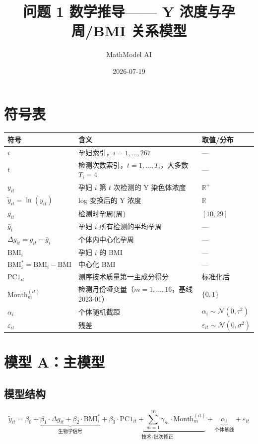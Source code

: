 \documentclass{internal-report}
\title{问题 1 数学推导—— Y 浓度与孕周/BMI 关系模型}
\author{MathModel AI}
\date{2026-07-19}
\begin{document}
\maketitle

\section{符号表}

\begin{tabular}{lll}
\toprule
符号 & 含义 & 取值/分布 \\
\midrule
$i$ & 孕妇索引，$i=1,\dots,267$ & — \\
$t$ & 检测次数索引，$t=1,\dots,T_i$，大多数 $T_i=4$ & — \\
$y_{it}$ & 孕妇 $i$ 第 $t$ 次检测的 Y 染色体浓度 & $\mathbb{R}^{+}$ \\
$\tilde{y}_{it} = \ln(y_{it})$ & log 变换后的 Y 浓度 & $\mathbb{R}$ \\
$g_{it}$ & 检测时孕周(周) & $[10, 29]$ \\
$\bar{g}_i$ & 孕妇 $i$ 所有检测的平均孕周 & — \\
$\Delta g_{it} = g_{it} - \bar{g}_i$ & 个体内中心化孕周 & — \\
$\text{BMI}_i$ & 孕妇 $i$ 的 BMI & — \\
$\text{BMI}_i^* = \text{BMI}_i - \overline{\text{BMI}}$ & 中心化 BMI & — \\
$\text{PC1}_{it}$ & 测序技术质量第一主成分得分 & 标准化后 \\
$\text{Month}_m^{(it)}$ & 检测月份哑变量（$m=1,\dots,16$，基线 2023-01） & $\{0,1\}$ \\
$\alpha_i$ & 个体随机截距 & $\alpha_i \sim \mathcal{N}(0, \tau^2)$ \\
$\varepsilon_{it}$ & 残差 & $\varepsilon_{it} \sim \mathcal{N}(0, \sigma^2)$ \\
\bottomrule
\end{tabular}

\section{模型 A：主模型}

\subsection{模型结构}

$$
\tilde{y}_{it} = \beta_0 + \underbrace{\beta_1 \cdot \Delta g_{it} + \beta_2 \cdot \text{BMI}_i^*}_{\text{生物学信号}} + \underbrace{\beta_3 \cdot \text{PC1}_{it} + \sum_{m=1}^{16} \gamma_m \cdot \text{Month}_m^{(it)}}_{\text{技术/批次修正}} + \underbrace{\alpha_i}_{\text{个体基线}} + \varepsilon_{it}
$$
\end{document}
